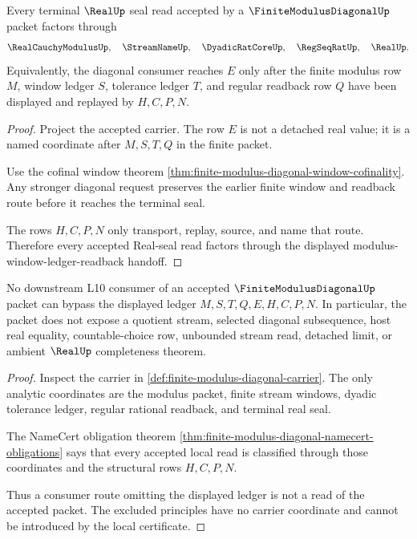 \begin{theorem}
\label{thm:finite-modulus-diagonal-real-seal-handoff}
Every terminal $\RealUp$ seal read accepted by a $\FiniteModulusDiagonalUp$ packet factors through
$$
\RealCauchyModulusUp,\quad \StreamNameUp,\quad \DyadicRatCoreUp,\quad \RegSeqRatUp,\quad \RealUp .
$$
Equivalently, the diagonal consumer reaches $E$ only after the finite modulus row $M$, window ledger $S$, tolerance ledger $T$, and regular readback row $Q$ have been displayed and replayed by $H,C,P,N$.
\end{theorem}
\begin{proof}
Project the accepted carrier. The row $E$ is not a detached real value; it is a named coordinate after $M,S,T,Q$ in the finite packet.

Use the cofinal window theorem \autoref{thm:finite-modulus-diagonal-window-cofinality}. Any stronger diagonal request preserves the earlier finite window and readback route before it reaches the terminal seal.

The rows $H,C,P,N$ only transport, replay, source, and name that route. Therefore every accepted Real-seal read factors through the displayed modulus-window-ledger-readback handoff.
\end{proof}

\begin{theorem}
\label{thm:finite-modulus-diagonal-ledger-nonescape}
No downstream L10 consumer of an accepted $\FiniteModulusDiagonalUp$ packet can bypass the displayed ledger $M,S,T,Q,E,H,C,P,N$. In particular, the packet does not expose a quotient stream, selected diagonal subsequence, host real equality, countable-choice row, unbounded stream read, detached limit, or ambient $\RealUp$ completeness theorem.
\end{theorem}
\begin{proof}
Inspect the carrier in \autoref{def:finite-modulus-diagonal-carrier}. The only analytic coordinates are the modulus packet, finite stream windows, dyadic tolerance ledger, regular rational readback, and terminal real seal.

The NameCert obligation theorem \autoref{thm:finite-modulus-diagonal-namecert-obligations} says that every accepted local read is classified through those coordinates and the structural rows $H,C,P,N$.

Thus a consumer route omitting the displayed ledger is not a read of the accepted packet. The excluded principles have no carrier coordinate and cannot be introduced by the local certificate.
\end{proof}

